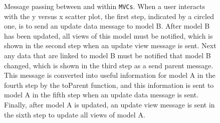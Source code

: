 \documentclass{article}[11pt]
\newcommand{\Rfunction}[1]{{\textsf{#1}}}
\newcommand{\Robject}[1]{{\texttt{#1}}}
\begin{document}
\begin{figure}[ht]
  \begin{center}
    \caption{ Message passing between and within \Robject{MVCs}.  When a user
      interacts with the y versus x scatter plot, the first step, indicated by
      a circled one, is to send an update data message to model B.  After
      model B has been updated, all views of this model must be notified, which
      is shown in the second step when an update view message is sent.  Next
      any data that are linked to model B must be notified that model B
      changed, which is shown in the third step as a send parent message.
      This message is converted into useful information for model A in
      the fourth step by the \Rfunction{toParent} function, and this
      information is sent to model A in the fifth step when an update data
      message is sent.  Finally, after model A is updated, an update view
      message is sent in the sixth step to update all views of model A. }
    \label{Fig:MessPass}
  \end{center}
\end{figure}
\end{document}
